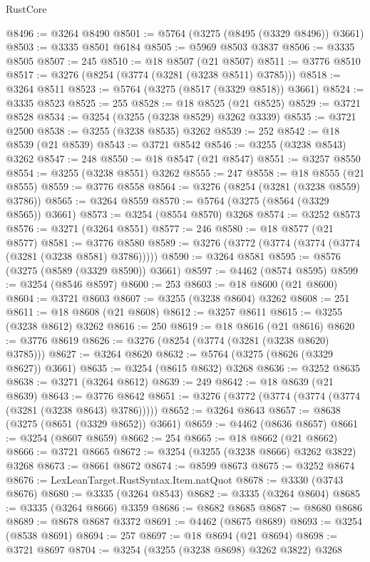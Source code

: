 \begin{lexlean}{RustCore}
\begin{coremodule}
@8496 := @3264 @8490
@8501 := @5764 (@3275 (@8495 (@3329 @8496)) @3661)
@8503 := @3335 @8501 @6184
@8505 := @5969 @8503 @3837
@8506 := @3335 @8505
@8507 := 245
@8510 := @18 @8507 (@21 @8507)
@8511 := @3776 @8510
@8517 := @3276 (@8254 (@3774 (@3281 (@3238 @8511) @3785)))
@8518 := @3264 @8511
@8523 := @5764 (@3275 (@8517 (@3329 @8518)) @3661)
@8524 := @3335 @8523
@8525 := 255
@8528 := @18 @8525 (@21 @8525)
@8529 := @3721 @8528
@8534 := @3254 (@3255 (@3238 @8529) @3262 @3339)
@8535 := @3721 @2500
@8538 := @3255 (@3238 @8535) @3262
@8539 := 252
@8542 := @18 @8539 (@21 @8539)
@8543 := @3721 @8542
@8546 := @3255 (@3238 @8543) @3262
@8547 := 248
@8550 := @18 @8547 (@21 @8547)
@8551 := @3257 @8550
@8554 := @3255 (@3238 @8551) @3262
@8555 := 247
@8558 := @18 @8555 (@21 @8555)
@8559 := @3776 @8558
@8564 := @3276 (@8254 (@3281 (@3238 @8559) @3786))
@8565 := @3264 @8559
@8570 := @5764 (@3275 (@8564 (@3329 @8565)) @3661)
@8573 := @3254 (@8554 @8570) @3268
@8574 := @3252 @8573
@8576 := @3271 (@3264 @8551)
@8577 := 246
@8580 := @18 @8577 (@21 @8577)
@8581 := @3776 @8580
@8589 := @3276 (@3772 (@3774 (@3774 (@3774 (@3281 (@3238 @8581) @3786)))))
@8590 := @3264 @8581
@8595 := @8576 (@3275 (@8589 (@3329 @8590)) @3661)
@8597 := @4462 (@8574 @8595)
@8599 := @3254 (@8546 @8597)
@8600 := 253
@8603 := @18 @8600 (@21 @8600)
@8604 := @3721 @8603
@8607 := @3255 (@3238 @8604) @3262
@8608 := 251
@8611 := @18 @8608 (@21 @8608)
@8612 := @3257 @8611
@8615 := @3255 (@3238 @8612) @3262
@8616 := 250
@8619 := @18 @8616 (@21 @8616)
@8620 := @3776 @8619
@8626 := @3276 (@8254 (@3774 (@3281 (@3238 @8620) @3785)))
@8627 := @3264 @8620
@8632 := @5764 (@3275 (@8626 (@3329 @8627)) @3661)
@8635 := @3254 (@8615 @8632) @3268
@8636 := @3252 @8635
@8638 := @3271 (@3264 @8612)
@8639 := 249
@8642 := @18 @8639 (@21 @8639)
@8643 := @3776 @8642
@8651 := @3276 (@3772 (@3774 (@3774 (@3774 (@3281 (@3238 @8643) @3786)))))
@8652 := @3264 @8643
@8657 := @8638 (@3275 (@8651 (@3329 @8652)) @3661)
@8659 := @4462 (@8636 @8657)
@8661 := @3254 (@8607 @8659)
@8662 := 254
@8665 := @18 @8662 (@21 @8662)
@8666 := @3721 @8665
@8672 := @3254 (@3255 (@3238 @8666) @3262 @3822) @3268
@8673 := @8661 @8672
@8674 := @8599 @8673
@8675 := @3252 @8674
@8676 := LexLeanTarget.RustSyntax.Item.natQuot
@8678 := @3330 (@3743 @8676)
@8680 := @3335 (@3264 @8543)
@8682 := @3335 (@3264 @8604)
@8685 := @3335 (@3264 @8666) @3359
@8686 := @8682 @8685
@8687 := @8680 @8686
@8689 := @8678 @8687 @3372
@8691 := @4462 (@8675 @8689)
@8693 := @3254 (@8538 @8691)
@8694 := 257
@8697 := @18 @8694 (@21 @8694)
@8698 := @3721 @8697
@8704 := @3254 (@3255 (@3238 @8698) @3262 @3822) @3268

\end{coremodule}
\end{lexlean}
